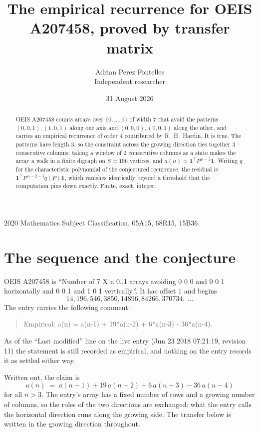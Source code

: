 \documentclass[11pt,a4paper]{article}
\title{The empirical recurrence for OEIS A207458, proved by transfer matrix}
\author{Adrian Perez Fontelles\\ \small Independent researcher}
\date{31 August 2026}
\theoremstyle{plain}
\theoremstyle{definition}
\begin{document}
\maketitle

\begin{abstract}
OEIS A207458 counts arrays over $\{0,\dots,1\}$ of width $7$ that avoid the patterns
$(0,0,1), (1,0,1)$ along one axis and $(0,0,0), (0,0,1)$ along the other, and carries an empirical recurrence of
order $4$ contributed by R.~H.~Hardin. It is true. The patterns have length $3$, so
the constraint across the growing direction ties together $3$ consecutive columns: taking a
window of $2$ consecutive columns as a state makes the array a walk in a finite digraph
on $S=196$ vertices, and $a(n)=\mathbf{1}^{\!\top}P^{\,n-2}\mathbf{1}$. Writing $q$
for the characteristic polynomial of the conjectured recurrence, the residual is
$\mathbf{1}^{\!\top}P^{\,n-2-4}q(P)\mathbf{1}$, which vanishes identically
beyond a threshold that the computation pins down exactly. Finite, exact, integer.
\end{abstract}

\noindent\small 2020 Mathematics Subject Classification. 05A15, 68R15, 15B36.\normalsize

\section{The sequence and the conjecture}

OEIS A207458 is ``Number of 7 X n 0..1 arrays avoiding 0 0 0 and 0 0 1 horizontally and 0 0 1 and 1 0 1 vertically.''. It has offset
$1$ and begins
\[
14, 196, 546, 3850, 14896, 84266, 370734,\ \dots
\]
The entry carries the following comment:
\begin{quote}\small
Empirical: a(n) = a(n-1) + 19*a(n-2) + 6*a(n-3) - 36*a(n-4).
\end{quote}
As of the ``Last modified'' line on the live entry (Jun 23 2018 07:21:19, revision
11) the statement is still recorded as empirical, and nothing on the entry
records it as settled either way.

Written out, the claim is
\begin{equation}\label{eq:conj}
a(n)\;=\;a(n-1) + 19\,a(n-2) + 6\,a(n-3) - 36\,a(n-4)
\end{equation}
for all $n>3$. The entry's array has a fixed number of rows and a growing number of
columns, so the roles of the two directions are exchanged: what the entry calls the
horizontal direction runs along the growing side. The transfer below is written in the
growing direction throughout.
\end{document}
